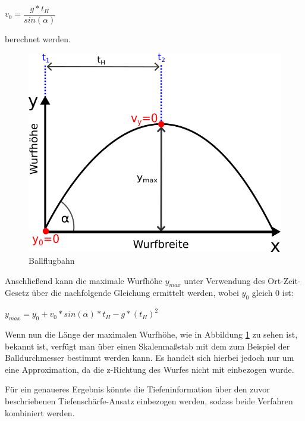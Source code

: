 \documentclass{ezb}
\begin{document}
\begin{center}
	$v_0 = \dfrac{g * t_H}{sin(\alpha)}$
\end{center}
berechnet werden.
\begin{figure}[!h]
	\centering
	\includegraphics[scale=1.5]{./img/BallflugbahnAnsatz1.png}
	\caption{Ballflugbahn}
	\label{abb:ballflugbahn}
\end{figure}
Anschließend kann die maximale Wurfhöhe $y_{max}$ unter Verwendung des Ort-Zeit-Gesetz über die nachfolgende Gleichung ermittelt werden, wobei $y_0$ gleich 0 ist:
\begin{center}
$y_{max} = y_0 + v_0 * sin(\alpha) * t_H - g * (t_{H})^{2}$
\end{center}
Wenn nun die Länge der maximalen Wurfhöhe, wie in Abbildung \ref{abb:ballflugbahn} zu sehen ist, bekannt ist, verfügt man über einen Skalenmaßstab mit dem zum Beispiel der Balldurchmesser bestimmt werden kann. Es handelt sich hierbei jedoch nur um eine Approximation, da die z-Richtung des Wurfes nicht mit einbezogen wurde. 

Für ein genaueres Ergebnis könnte die Tiefeninformation über den zuvor beschriebenen Tiefenschärfe-Ansatz einbezogen werden, sodass beide Verfahren kombiniert werden.
\end{document}
